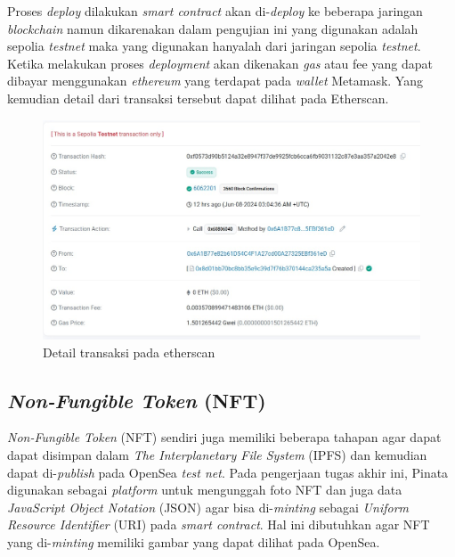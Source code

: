 Proses \emph{deploy} dilakukan \emph{smart contract} akan di-\emph{deploy} ke beberapa jaringan \emph{blockchain} namun dikarenakan dalam pengujian ini yang digunakan adalah sepolia \emph{testnet} maka yang digunakan hanyalah dari jaringan sepolia \emph{testnet}. Ketika melakukan proses \emph{deployment} akan dikenakan \emph{gas} atau fee yang dapat dibayar menggunakan \emph{ethereum} yang terdapat pada \emph{wallet} Metamask. Yang kemudian detail dari transaksi tersebut dapat dilihat pada Etherscan.

\begin{figure} [H] \centering
  \includegraphics[scale=0.45]{gambar/etherscan.jpeg}
  \caption{Detail transaksi pada etherscan}
  \label{fig:transaction}
\end{figure}

\subsection{\emph{Non-Fungible Token} (NFT)}
\emph{Non-Fungible Token} (NFT) sendiri juga memiliki beberapa tahapan agar dapat dapat disimpan dalam \emph{The Interplanetary File System} (IPFS) dan kemudian dapat di-\emph{publish} pada OpenSea \emph{test net}. Pada pengerjaan tugas akhir ini, Pinata digunakan sebagai \emph{platform} untuk mengunggah foto NFT dan juga data \emph{JavaScript Object Notation} (JSON) agar bisa di-\emph{minting} sebagai \emph{Uniform Resource Identifier} (URI) pada \emph{smart contract}. Hal ini dibutuhkan agar NFT yang di-\emph{minting} memiliki gambar yang dapat dilihat pada OpenSea.

